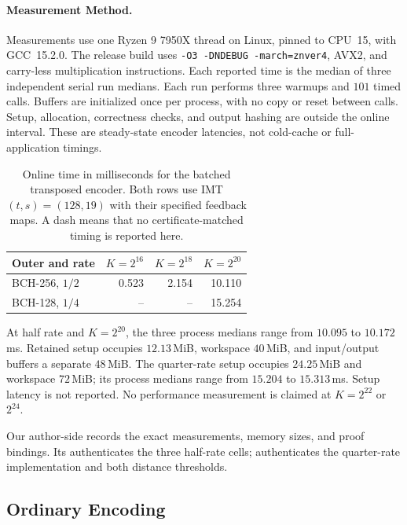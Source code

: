 \paragraph{Measurement Method.}
Measurements use one Ryzen 9 7950X thread on Linux, pinned to CPU~15, with
GCC~15.2.0. The release build uses \texttt{-O3 -DNDEBUG -march=znver4},
AVX2, and carry-less multiplication instructions.
Each reported time is the median of three independent serial run medians.
Each run performs three warmups and $101$ timed calls. Buffers are initialized
once per process, with no copy or reset between calls.
Setup, allocation, correctness checks, and output hashing
are outside the online interval. These are steady-state encoder latencies,
not cold-cache or full-application timings.

\begin{table}[tb]
\centering
\caption{Online time in milliseconds for the batched transposed encoder.
Both rows use IMT $(t,s)=(128,19)$ with their specified feedback maps.
A dash means that no certificate-matched timing is reported here.}
\label{tab:finite-bch-performance}
\begin{tabular}{@{}lrrr@{}}
\toprule
Outer and rate & $K=2^{16}$ & $K=2^{18}$ & $K=2^{20}$ \\
\midrule
BCH-256, $1/2$ & 0.523 & 2.154 & 10.110 \\
BCH-128, $1/4$ & -- & -- & 15.254 \\
\bottomrule
\end{tabular}
\end{table}

At half rate and $K=2^{20}$, the three process medians range from
$10.095$ to $10.172$\,ms. Retained setup occupies $12.13$\,MiB,
workspace $40$\,MiB, and input/output buffers a separate $48$\,MiB.
The quarter-rate setup occupies $24.25$\,MiB and workspace $72$\,MiB;
its process medians range from $15.204$ to $15.313$\,ms.
Setup latency is not reported. No performance measurement is claimed at
$K=2^{22}$ or $2^{24}$.

Our author-side
records the exact measurements, memory sizes, and proof bindings.
Its  authenticates the three
half-rate cells;  authenticates the
quarter-rate implementation and both distance thresholds.

\subsection{Ordinary Encoding}
\label{sec:ordinary-encoding}


